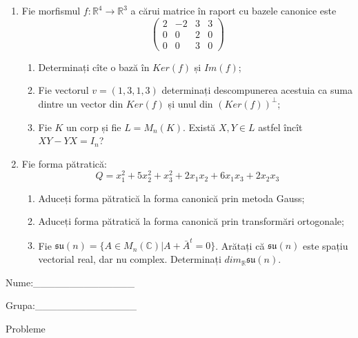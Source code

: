 \documentclass{article}
\begin{document}
\begin{enumerate}
 \item Fie morfismul $f:\mathbb{R}^4 \to \mathbb{R}^3$ a cărui matrice în raport cu bazele canonice este
$$\begin{pmatrix}
2&-2&3&3\\
0&0&2&0\\
0&0&3&0
\end{pmatrix}$$

\begin{enumerate}
\item Determinați cîte o bază în $Ker(f)$ și $Im(f)$;
\item Fie vectorul $v=(1,3,1,3)$ determinați descompunerea acestuia ca suma dintre un vector din $Ker(f)$ și unul din $(Ker(f))^\perp$;
\item Fie $K$ un corp și fie $L=M_n(K)$. Există $X,Y \in L$ astfel încît $XY-YX=I_n$?  
\end{enumerate}
\item Fie forma pătratică:
$$Q= x_1^2+5x_2^2+x_3^2+2x_1x_2+6x_1x_3+2x_2x_3$$

\begin{enumerate}
\item Aduceți forma pătratică la forma canonică prin metoda Gauss;
\item Aduceți forma pătratică la forma canonică prin transformări ortogonale;
\item Fie $\mathfrak{su}(n)=\{ A \in M_n(\mathbb{C}) | A+\bar{A}^t=0\}$. Arătați că $\mathfrak{su}(n)$ este spațiu vectorial real, dar nu complex.
Determinați $dim_{\mathbb{R}}\mathfrak{su}(n)$.
\end{enumerate}
\end{enumerate}
\newpage
\begin{flushright}
Nume:\_\_\_\_\_\_\_\_\_\_\_\_\_\_
 
 
Grupa:\_\_\_\_\_\_\_\_\_\_\_\_\_\_
\end{flushright}
\begin{center}
\vspace{2cm}
{\Large Probleme}
\vspace{2cm}
\end{center}
\end{document}
